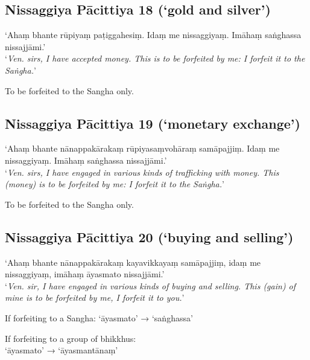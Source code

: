 
\vspace*{-\baselineskip}

\subsection{Nissaggiya Pācittiya 18 (‘gold and silver’)}

‘Ahaṃ bhante rūpiyaṃ paṭiggahesiṃ. Idaṃ me nissaggiyaṃ. Imāhaṃ saṅghassa
nissajjāmi.’\\
‘\emph{Ven. sirs, I have accepted money. This is to be forfeited by me: I
  forfeit it to the Saṅgha.}’

To be forfeited to the Sangha only. 

\subsection{Nissaggiya Pācittiya 19 (‘monetary exchange’)}

‘Ahaṃ bhante nānappakārakaṃ rūpiyasaṃvohāraṃ samāpajjiṃ. Idaṃ me nissaggiyaṃ.
Imāhaṃ saṅghassa nissajjāmi.’\\
‘\emph{Ven. sirs, I have engaged in various kinds of trafficking with money.
  This (money) is to be forfeited by me: I forfeit it to the Saṅgha.}’

To be forfeited to the Sangha only. 

\subsection{Nissaggiya Pācittiya 20 (‘buying and selling’)}

‘Ahaṃ bhante nānappakārakaṃ kayavikkayaṃ samāpajjiṃ, idaṃ me nissaggiyaṃ, imāhaṃ
āyasmato nissajjāmi.’\\
‘\emph{Ven. sir, I have engaged in various kinds of buying and selling. This
  (gain) of mine is to be forfeited by me, I forfeit it to you.}’\\
\mbox{}

If forfeiting to a Sangha: ‘āyasmato’ → ‘saṅghassa’

If forfeiting to a group of bhikkhus:\\
‘āyasmato’ → ‘āyasmantānaṃ’


